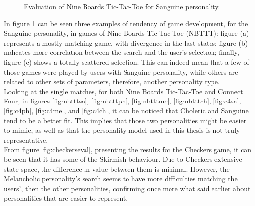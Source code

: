 \begin{figure}[ht!]
     \quad
  \captionsetup{justification=centering}
    \caption{Evaluation of Nine Boards Tic-Tac-Toe for Sanguine personality.}
    \label{fig:nbtsa}
\end{figure}
In figure \ref{fig:nbtsa} can be seen three examples of tendency of game development, for the Sanguine personality, in games of Nine Boards Tic-Tac-Toe (NBTTT): figure (a) represents a mostly matching game, with divergence in the last states; figure (b) indicates more correlation between the search and the user's selection; finally, figure (c) shows a totally scattered selection. This can indeed mean that a few of those games were played by users with Sanguine personality, while others are related to other sets of parameters, therefore, another personality type.\\
Looking at the single matches, for both Nine Boards Tic-Tac-Toe and Connect Four, in figures \ref{fig:nbtttsa}, \ref{fig:nbtttph}, \ref{fig:nbtttme}, \ref{fig:nbtttch}, \ref{fig:c4sa}, \ref{fig:c4ph}, \ref{fig:c4me}, and \ref{fig:c4ch}, it can be noticed that Choleric and Sanguine tend to be a better fit. This implies that those two personalities might be easier to mimic, as well as that the personality model used in this thesis is not truly representative.\\
From figure \ref{fig:checkerseval}, presenting the results for the Checkers game, it can be seen that it has some of the Skirmish behaviour. Due to Checkers extensive state space, the difference in value between them is minimal. However, the Melancholic personality's search seems to have more difficulties matching the users', then the other personalities, confirming once more what said earlier about personalities that are easier to represent.
